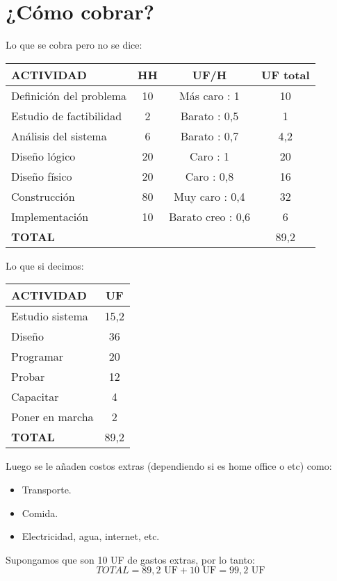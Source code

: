 \documentclass{templateNote}
\begin{document}
\section{¿C\'omo cobrar?}
\noindent
Lo que se cobra pero no se dice:
\begin{center}
    \begin{tabular}{|l|c|c|c|}
        \hline
        \textbf{ACTIVIDAD} & \textbf{HH} & \textbf{UF/H} & \textbf{UF total} \\ \hline
        Definici\'on del problema & 10 & M\'as caro : 1 & 10 \\ \hline
        Estudio de factibilidad & 2 & Barato : 0,5 & 1 \\ \hline
        An\'alisis del sistema & 6 & Barato : 0,7 & 4,2 \\ \hline
        Dise\~no l\'ogico & 20 & Caro : 1 & 20 \\ \hline
        Dise\~no f\'isico & 20 & Caro : 0,8 & 16 \\ \hline
        Construcci\'on & 80 & Muy caro : 0,4 & 32 \\ \hline
        Implementaci\'on & 10 & Barato creo : 0,6 & 6 \\ \hline
        \textbf{TOTAL} & & & 89,2 \\ \hline
    \end{tabular}
\end{center}
Lo que si decimos:
\begin{center}
    \begin{tabular}{|l|c|}
        \hline
        \textbf{ACTIVIDAD} & \textbf{UF} \\ \hline
        Estudio sistema & 15,2 \\ \hline
        Dise\~no & 36 \\ \hline
        Programar & 20 \\ \hline
        Probar & 12 \\ \hline
        Capacitar & 4 \\ \hline
        Poner en marcha & 2 \\ \hline
        \textbf{TOTAL} & 89,2 \\ \hline
    \end{tabular}    
\end{center}
Luego se le a\~naden costos extras (dependiendo si es home office o etc) como:
\begin{itemize}
    \item Transporte.
    \item Comida.
    \item Electricidad, agua, internet, etc.
\end{itemize}
Supongamos que son 10 UF de gastos extras, por lo tanto:
\begin{equation*}
    TOTAL = 89,2 \text{ UF} + 10 \text{ UF} = 99,2 \text{ UF}
\end{equation*}
\end{document}
